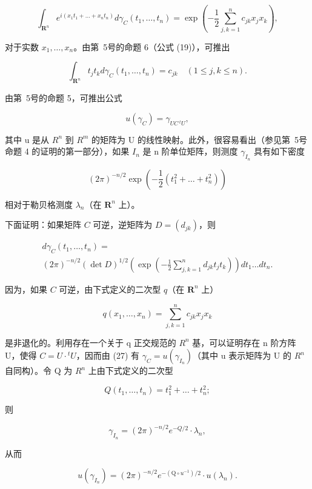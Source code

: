\[
\int_ {\mathbf {R} ^ {n}} e ^ {i (x _ {1} t _ {1} + \dots + x _ {n} t _ {n})} d \gamma_ {C} (t _ {1}, \dots , t _ {n}) = \exp \left(- \frac {1}{2} \sum_ {j, k = 1} ^ {n} c _ {j k} x _ {j} x _ {k}\right),\tag{25}
\]

对于实数 \(x_{1}, \ldots, x_{n}\)。由第~5号的命题 6（公式 (19)），可推出

\[
\int_ {\mathbf {R} ^ {n}} t _ {j} t _ {k} d \gamma_ {C} (t _ {1}, \dots , t _ {n}) = c _ {j k} \quad (1 \leqslant j, k \leqslant n).\tag{26}
\]

由第~5号的命题 5，可推出公式

\[
u (\gamma_ {C}) = \gamma_{U C\,{}^{t}U}  ,\tag{27}
\]

其中 u 是从 \(R^{n}\) 到 \(R^{m}\) 的矩阵为 U 的线性映射。此外，很容易看出（参见第~5号命题 4 的证明的第一部分），如果 \(I_{n}\) 是 n 阶单位矩阵，则测度 \(\gamma_{I_{n}}\) 具有如下密度

\[
(2 \pi) ^ {- n / 2} \exp \left(- \frac {1}{2} (t _ {1} ^ {2} + \dots + t _ {n} ^ {2})\right)
\]

 相对于勒贝格测度 \(\lambda_{n}\)（在 \(\mathbf{R}^{n}\) 上）。

下面证明：如果矩阵 \(C\) 可逆，逆矩阵为 \(D = (d_{jk})\)，则

\[
\begin{array}{l} d \gamma_ {C} (t _ {1}, \dots , t _ {n}) = \\ (2 \pi) ^ {- n / 2} (\det D) ^ {1 / 2} \left(\exp \left(- \frac {1}{2} \sum_ {j, k = 1} ^ {n} d _ {j k} t _ {j} t _ {k}\right)\right) d t _ {1} \dots d t _ {n}. \end{array}\tag{28}
\]

 因为，如果 \(C\) 可逆，由下式定义的二次型 \(q\)（在 \(\mathbf{R}^n\) 上）

\[
q (x _ {1}, \dots , x _ {n}) = \sum_ {j, k = 1} ^ {n} c _ {j k} x _ {j} x _ {k}
\]

是非退化的。利用存在一个关于 q 正交规范的 \(R^{n}\) 基，可以证明存在 n 阶方阵 U，使得 \(C = U \cdot {}^{t}U\)，因而由 (27) 有 \(\gamma_{C} = u(\gamma_{I_{n}})\)（其中 u 表示矩阵为 U 的 \(R^{n}\) 自同构）。令 Q 为 \(R^{n}\) 上由下式定义的二次型

\[
Q (t _ {1}, \dots , t _ {n}) = t _ {1} ^ {2} + \dots + t _ {n} ^ {2};
\]

则

\[
\gamma_ {I _ {n}} = (2 \pi) ^ {- n / 2} e ^ {- Q / 2} \cdot \lambda_ {n},
\]

从而

\[
u (\gamma_ {I _ {n}}) = (2 \pi) ^ {- n / 2} e ^ {- (\mathrm{Q} \circ u ^ {- 1}) / 2} \cdot u (\lambda_ {n}).\tag{29}
\]

